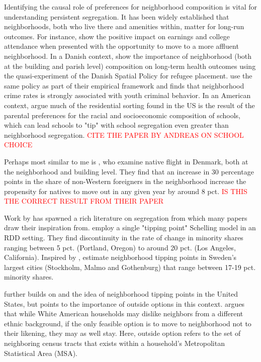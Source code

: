 \documentclass[../main.tex]{subfiles}
\begin{document}
Identifying the causal role of preferences for neighborhood composition is vital for understanding persistent segregation. It has been widely established that neighborhoods, both who live there and amenities within, matter for long-run outcomes. For instance, \textcite{chetty2016effects} show the positive impact on earnings and college attendance when presented with the opportunity to move to a more affluent neighborhood. In a Danish context, \textcite{hasager2024sick_poor_neighborhood} show the importance of neighborhood (both at the building and parish level) composition on long-term health outcomes using the quasi-experiment of the Danish Spatial Policy for refugee placement. \textcite{damm2014crime} use the same policy as part of their empirical framework and finds that neighborhood crime rates is strongly associated with youth criminal behavior. In an American context, \textcite{caetano2017school} argue much of the residential sorting found in the US is the result of the parental preferences for the racial and socioeconomic composition of schools, which can lead schools to "tip" with school segregation even greater than neighborhood segregation. \textcolor{red}{CITE THE PAPER BY ANDREAS ON SCHOOL CHOICE} 

Perhaps most similar to me is \textcite{rockwool_boje2024immigrants}, who examine native flight in Denmark, both at the neighborhood and building level. They find that an increase in 30 percentage points in the share of non-Western foreigners in the neighborhood increase the propensity for natives to move out in any given year by around 8 pct. \textcolor{red}{IS THIS THE CORRECT RESULT FROM THEIR PAPER} 

Work by \textcite{schelling1971dynamic} has spawned a rich literature on segregation from which many papers draw their inspiration from.  \textcite{card2008tipping} employ a single "tipping point" Schelling model in an RDD setting. They find discontinuity in the rate of change in minority shares ranging between 5 pct. (Portland, Oregon) to around 20 pct. (Los Angeles, California). Inspired by \textcite{card2008tipping},\textcite{bohlmark_willen_2020_tipping} estimate neighborhood tipping points in Sweden's largest cities (Stockholm, Malmo and Gothenburg) that range between 17-19 pct. minority shares.

\textcite{blair2017outside} further builds on \textcite{card2008tipping} and the idea of neighborhood tipping points in the United States, but points to the importance of outside options in this context. \textcite{blair2017outside} argues  that while White American households may dislike neighbors from a different ethnic background, if the only feasible option is to move to neighborhood not to their likening, they may as well stay. Here, outside option refers to the set of neighboring census tracts that exists within a household's Metropolitan Statistical Area (MSA). 
\end{document}
